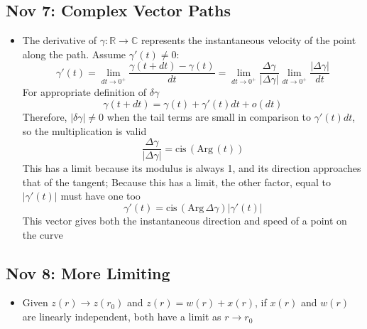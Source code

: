 \documentclass[10pt, oneside]{article}
\newcommand{\R}{\mathbb{R}}
\newcommand{\C}{\mathbb{C}}
\newcommand{\cis}{\text{cis} \,}
\newcommand{\Arg}{\text{Arg} \,}
\begin{document}
\subsection{Nov 7: Complex Vector Paths}
\begin{itemize}
    \item The derivative of $\gamma : \R \rightarrow \C$ represents the instantaneous velocity of the point along the path. Assume $\gamma'(t) \neq 0$:
        \[\gamma'(t) = \lim_{dt \rightarrow 0^+} \frac{\gamma(t+dt) - \gamma(t)}{dt} = \lim_{dt \rightarrow 0^+} \frac{\Delta 
        \gamma}{|\Delta \gamma|} \lim_{dt \rightarrow 0^+} \frac{|\Delta \gamma|}{dt}\]
        For appropriate definition of $\delta \gamma$
        \[\gamma(t + dt) = \gamma(t) + \gamma'(t)dt + o(dt)\]
        Therefore, $|\delta \gamma| \neq 0$ when the tail terms are small in comparison to $\gamma'(t)dt$, so the multiplication is valid
        \[\frac{\Delta \gamma}{|\Delta \gamma|} = \cis(\Arg(t))\]
        This has a limit because its modulus is always 1, and its direction approaches that of the tangent; Because this has a limit, the other factor, equal to $|\gamma'(t)|$ must have one too
        \[\gamma'(t) = \cis(\Arg \Delta \gamma) |\gamma'(t)|\]
        This vector gives both the instantaneous direction and speed of a point on the curve
\end{itemize}

\subsection{Nov 8: More Limiting}
\begin{itemize}
    \item Given $z(r) \rightarrow z(r_0)$ and $z(r) = w(r) + x(r)$, if $x(r)$ and $w(r)$ are linearly independent, both have a limit as $r \rightarrow r_0$
\end{itemize}
\end{document}
